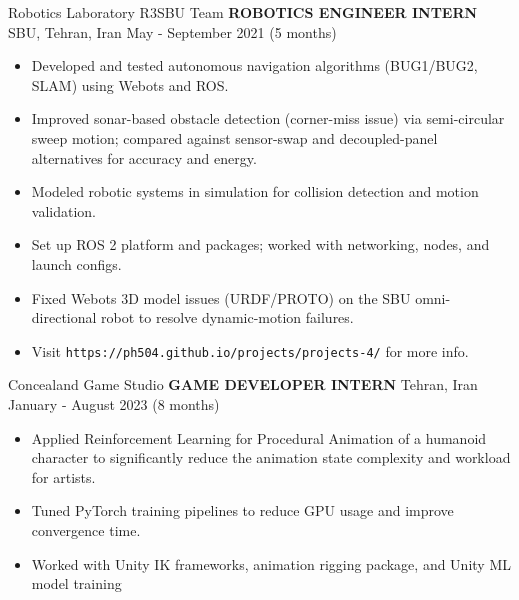 \begin{cventries}
    \cventry
    {Robotics Laboratory \textemdash R3SBU Team}
    {\textbf{ROBOTICS ENGINEER INTERN}}
    {SBU, Tehran, Iran}
    {May - September 2021 (5 months)}
    {
        \begin{itemize}
            \item Developed and tested autonomous navigation algorithms (BUG1/BUG2, SLAM) using Webots and ROS.
            \item Improved sonar-based obstacle detection (corner-miss issue) via semi-circular sweep motion; compared against sensor-swap and decoupled-panel alternatives for accuracy and energy.
            \item Modeled robotic systems in simulation for collision detection and motion validation.
            \item Set up ROS 2 platform and packages; worked with networking, nodes, and launch configs.
            \item Fixed Webots 3D model issues (URDF/PROTO) on the SBU omni-directional robot to resolve dynamic-motion failures.
            \item Visit \texttt{https://ph504.github.io/projects/projects-4/} for more info.
        \end{itemize}
    }
\end{cventries}
                              
\begin{cventries}
    \cventry
    {Concealand Game Studio}
    {\textbf{GAME DEVELOPER INTERN}}
    {Tehran, Iran}
    {January - August 2023 (8 months)}
    {
        \begin{itemize}    
            \item Applied Reinforcement Learning for Procedural Animation of a humanoid character to significantly reduce the animation state complexity and workload for artists.
            \item Tuned PyTorch training pipelines to reduce GPU usage and improve convergence time.
            \item Worked with Unity IK frameworks, animation rigging package, and Unity ML model training
        \end{itemize}
    }
\end{cventries}

